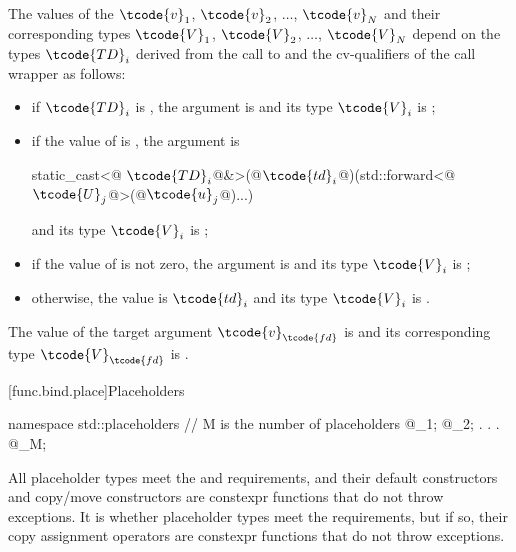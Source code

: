 \pnum
{}%
The values of the  $\tcode{v}_1$, $\tcode{v}_2$, $\dotsc$, $\tcode{v}_N$ and their
corresponding types $\tcode{V}_1$, $\tcode{V}_2$, $\dotsc$, $\tcode{V}_N$ depend on the
types $\tcode{TD}_i$ derived from
the call to  and the
cv-qualifiers \cv{} of the call wrapper  as follows:
\begin{itemize}
\item if $\tcode{TD}_i$ is , the
argument is  and its type $\tcode{V}_i$ is ;

\item if the value of 
is , the argument is
\begin{codeblock}
static_cast<@\cv{} $\tcode{TD}_i$@&>(@$\tcode{td}_i$@)(std::forward<@$\tcode{U}_j$@>(@$\tcode{u}_j$@)...)
\end{codeblock}
and its type $\tcode{V}_i$ is
;

\item if the value  of 
is not zero, the  argument is 
and its type $\tcode{V}_i$
is ;

\item otherwise, the value is $\tcode{td}_i$ and its type $\tcode{V}_i$
is .
\end{itemize}

\pnum
The value of the target argument $\tcode{v}_\tcode{fd}$ is  and
its corresponding type $\tcode{V}_\tcode{fd}$ is .
%

[func.bind.place]{Placeholders}

%
%
\begin{codeblock}
namespace std::placeholders {
  // M is the  number of placeholders
  @\seebelow@ _1;
  @\seebelow@ _2;
              .
              .
              .
  @\seebelow@ _M;
}
\end{codeblock}

\pnum
All placeholder types meet the  and
 requirements, and
their default constructors and copy/move
constructors are constexpr functions that
do not throw exceptions. It is  whether
placeholder types meet the  requirements,
but if so, their copy assignment operators are
constexpr functions that do not throw exceptions.


